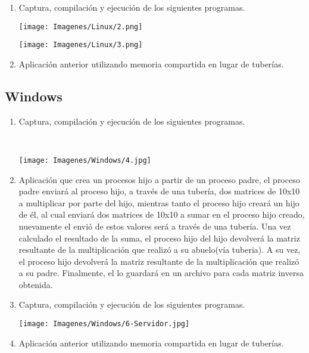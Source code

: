 \documentclass[12pt]{article}
\begin{document}
\begin{enumerate}
    \item Captura, compilación y ejecución de los siguientes programas.
    
    
    
     \begin{center}
		\texttt{[image: Imagenes/Linux/2.png]}
    \end{center}
     \begin{center}
		\texttt{[image: Imagenes/Linux/3.png]}
    \end{center}
    
     \item Aplicación anterior utilizando memoria compartida en lugar de tuberías.
    
    \end{enumerate}
    
\subsection{Windows}
\begin{enumerate}

    \item Captura, compilación y ejecución de los siguientes programas.
    
    
    \\
    \begin{center}
        \texttt{[image: Imagenes/Windows/4.jpg]}
    \end{center}

    
    \item Aplicación que crea un procesos hijo a partir de un proceso padre, el proceso padre enviará al proceso hijo, a través de una tubería, dos matrices de 10x10 a multiplicar por parte del hijo, mientras tanto el proceso hijo creará un hijo de él, al cual enviará dos matrices de 10x10 a sumar en el proceso hijo creado, nuevamente el envió de estos valores será a través de una tubería. Una vez calculado el resultado de la suma, el proceso hijo del hijo devolverá la matriz resultante de la multiplicación que realizó a su abuelo(vía tuberia). A su vez, el proceso hijo devolverá la matriz resultante de la multiplicación que realizó a su padre. Finalmente, el lo guardará en un archivo para cada matriz inversa obtenida.
    
     \item Captura, compilación y ejecución de los siguientes programas.
    
    
    
    \begin{center}
        \texttt{[image: Imagenes/Windows/6-Servidor.jpg]}
    \end{center}
    \item Aplicación anterior utilizando memoria compartida en lugar de tuberías.
    
  
\end{enumerate}
\end{document}
